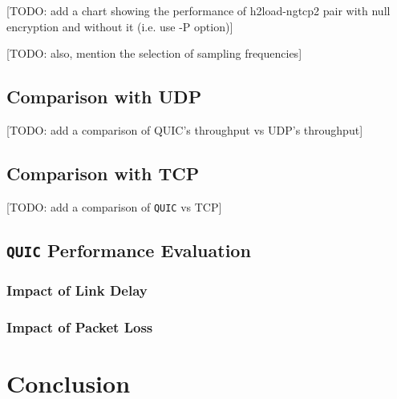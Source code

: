 \documentclass[12pt,a4paper,twoside,openright]{report}
\begin{document}


[TODO: add a chart showing the performance of h2load-ngtcp2 pair with null encryption and without it (i.e. use -P option)]

[TODO: also, mention the selection of sampling frequencies]


\section{Comparison with UDP}
[TODO: add a comparison of QUIC's throughput vs UDP's throughput]


\section{Comparison with TCP}
[TODO: add a comparison of \texttt{QUIC} vs TCP]




\section{\texttt{QUIC} Performance Evaluation}


\subsection{Impact of Link Delay}



\subsection{Impact of Packet Loss}


\chapter{Conclusion}


\end{document}
